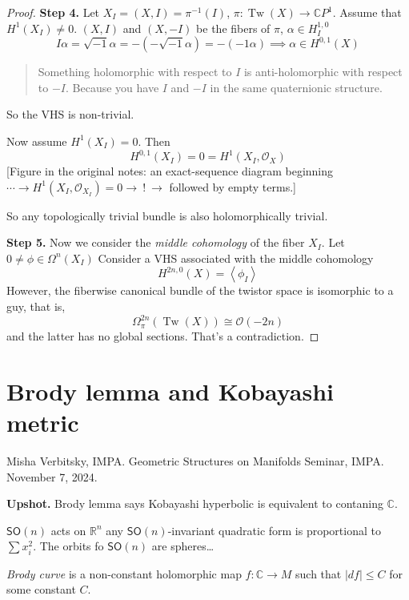 \begin{proof}
\medskip\noindent
{\bf Step 4.}
Let $X_I=(X,I)=\pi^{-1}(I)$,
$\pi:\operatorname{Tw}(X)\to
\mathbb{C}P^{1}$. Assume that $H^{1}(X_I)\neq
0$. $(X,I)$ and $(X,-I)$ be the fibers of
$\pi$, $\alpha\in H^{1,0}_I$
$$
I\alpha=\sqrt{-1}\alpha=-(-\sqrt{-1}\alpha)=
-(-1\alpha)\implies
\alpha\in H^{0,1}(X)
$$
\begin{quote}
Something holomorphic with respect to $I$ is
anti-holomorphic with respect to $-I$.
Because you have $I$ and $-I$ in the same
quaternionic structure.
\end{quote}

So the VHS is non-trivial.

Now assume $H^{1}(X_I)=0$. Then
$$
H^{0,1}(X_I)=0=H^{1}(X_I,\mathcal{O}_X)
$$
[Figure in the original notes: an
exact-sequence diagram beginning $\cdots\to
H^{1}(X_I,\mathcal{O}_{X_I})=0\to\ !\ \to$
followed by empty terms.]

So any topologically trivial bundle is also
holomorphically trivial.

\medskip\noindent
{\bf Step 5.}
Now we consider the {\it middle cohomology}
of the fiber $X_I$. Let $0\neq
\phi\in\Omega^{n}(X_I)$ Consider a VHS
associated with the middle cohomology
$$
H^{2n,0}(X)=\left\langle{}
\phi_I\right\rangle{}
$$
However, the fiberwise canonical bundle of
the twistor space is isomorphic to a guy,
that is,
$$
\Omega^{2n}_\pi(\operatorname{Tw}(X))\cong
\mathcal{O}(-2n)
$$
and the latter has no global sections. That's
a contradiction.
\end{proof}

\section{Brody lemma and Kobayashi metric}
\label{section-brody-kobayashi}

\noindent
Misha Verbitsky, IMPA.
Geometric Structures on Manifolds Seminar,
IMPA.
November 7, 2024.

\medskip\noindent
{\bf Upshot.}
Brody lemma says Kobayashi hyperbolic is
equivalent to contaning $\mathbb{C}$.

\medskip\noindent
$\mathsf{SO}(n)$ acts on $\mathbb{R}^n$ any
$\mathsf{SO}(n)$-invariant quadratic form is
proportional to $\sum x_i^2$. The orbits fo
$\mathsf{SO}(n)$ are spheres…

\begin{definition}
\label{definition-bk-brody-curve}
{\it Brody curve} is a non-constant
holomorphic map $f:\mathbb{C}\to M$ such that
$|df|\leq C$ for some constant $C$.
\end{definition}


